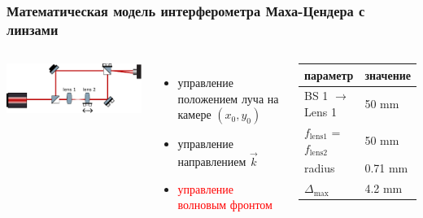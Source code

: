 \begin{frame}
\frametitle{Математическая модель интерферометра Маха-Цендера с линзами}
\begin{columns}
  \centering
   \includegraphics[width=1\linewidth]{images/MZI_expl_lenses.pdf}
  \begin{itemize}
    \item управление положением луча на камере $(x_0, y_0)$
    \item управление направлением $\vec{k}$
    \item \textcolor{red}{управление волновым фронтом}
  \end{itemize}

\begin{table} [htbp]
    \centering
    \begin{threeparttable}
        \begin{tabular}{| p{2.5cm} || p{2cm} |}
            \hline
            \hline
            параметр & значение \\
            \hline
            BS 1 $\to$ Lens 1 & 50 mm\\
            $f_{\mathrm{lens 1}}$ = $f_{\mathrm{lens 2}}$ & 50 mm\\
            radius & 0.71 mm\\
            $\Delta_{\mathrm{max}}$ & 4.2 mm\\
            \hline
            \hline
        \end{tabular}
    \end{threeparttable}
\end{table}

\end{columns} 
\end{frame}

